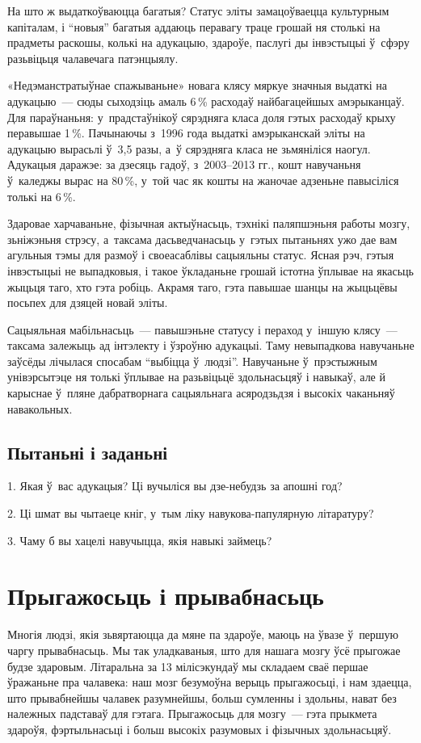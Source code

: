 На што ж выдаткоўваюцца багатыя? Статус эліты замацоўваецца культурным капіталам, і ``новыя'' багатыя аддаюць перавагу траце грошай ня столькі на прадметы раскошы, колькі на адукацыю, здароўе, паслугі ды інвэстыцыі ў~сфэру разьвіцьця чалавечага патэнцыялу.

«Недэманстратыўнае спажываньне» новага клясу мяркуе значныя выдаткі на адукацыю~--- сюды сыходзіць амаль 6\,\% расходаў найбагацейшых амэрыканцаў. Для параўнаньня: у~прадстаўнікоў сярэдняга класа доля гэтых расходаў крыху перавышае 1\,\%. Пачынаючы з~1996 года выдаткі амэрыканскай эліты на адукацыю вырасьлі ў~3,5 разы, а~ў сярэдняга класа не зьмяніліся наогул. Адукацыя даражэе: за дзесяць гадоў, з~2003--2013 гг., кошт навучаньня ў~каледжы вырас на 80\,\%, у~той час як кошты на жаночае адзеньне павысіліся толькі на 6\,\%.

Здаровае харчаваньне, фізычная актыўнасьць, тэхнікі паляпшэньня работы мозгу, зьніжэньня стрэсу, а~таксама дасьведчанасьць у~гэтых пытаньнях ужо дае вам агульныя тэмы для размоў і своеасаблівы сацыяльны статус. Ясная рэч, гэтыя інвэстыцыі не выпадковыя, і такое ўкладаньне грошай істотна ўплывае на якасьць жыцьця таго, хто гэта робіць. Акрамя таго, гэта павышае шанцы на жыцьцёвы посьпех для дзяцей новай эліты.

Сацыяльная мабільнасьць~--- павышэньне статусу і пераход у~іншую клясу~--- таксама залежыць ад інтэлекту і ўзроўню адукацыі. Таму невыпадкова навучаньне заўсёды лічылася спосабам ``выбіцца ў~людзі''. Навучаньне ў~прэстыжным унівэрсытэце ня толькі ўплывае на разьвіцьцё здольнасьцяў і навыкаў, але й карыснае ў~пляне дабратворнага сацыяльнага асяродзьдзя і высокіх чаканьняў навакольных.

\subsection*{Пытаньні і заданьні}

1. Якая ў~вас адукацыя? Ці вучыліся вы дзе-небудзь за апошні год?

2. Ці шмат вы чытаеце кніг, у~тым ліку навукова-папулярную літаратуру?

3. Чаму б вы хацелі навучыцца, якія навыкі займець?


\section{Прыгажосьць і прывабнасьць}

Многія людзі, якія зьвяртаюцца да мяне па здароўе, маюць на ўвазе ў~першую чаргу прывабнасьць. Мы так уладкаваныя, што для нашага мозгу ўсё прыгожае будзе здаровым. Літаральна за 13 мілісэкундаў мы складаем сваё першае ўражаньне пра чалавека: наш мозг безумоўна верыць прыгажосьці, і нам здаецца, што прывабнейшы чалавек разумнейшы, больш сумленны і здольны, нават без належных падставаў для гэтага. Прыгажосьць для мозгу~--- гэта прыкмета здароўя, фэртыльнасьці і больш высокіх разумовых і фізычных здольнасьцяў.

